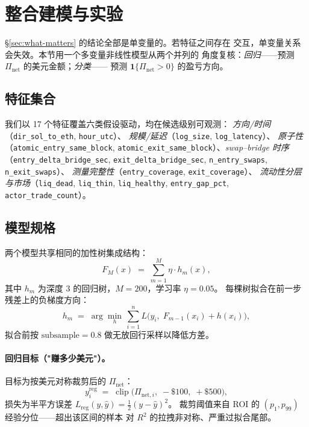 \documentclass[sigconf,nonacm,10pt]{acmart}
\newcommand{\Pnet}{\Pi_{\text{net}}}
\begin{document}
\section{整合建模与实验}
\label{sec:model}

\S\ref{sec:what-matters} 的结论全部是单变量的。若特征之间存在
交互，单变量关系会失效。本节用一个多变量非线性模型从两个并列的
角度复核：\emph{回归}——预测 $\Pnet$ 的美元金额；\emph{分类}——
预测 $\mathbf{1}\{\Pnet>0\}$ 的盈亏方向。

\subsection{特征集合}
\label{sec:features}

我们以 17 个特征覆盖六类假设驱动，均在候选级别可观测：
\emph{方向/时间}（\texttt{dir\_sol\_to\_eth}, \texttt{hour\_utc}）、
\emph{规模/延迟}（\texttt{log\_size}, \texttt{log\_latency}）、
\emph{原子性}（\texttt{atomic\_entry\_same\_block},
\texttt{atomic\_exit\_same\_block}）、\emph{swap--bridge 时序}
（\texttt{entry\_delta\_bridge\_sec},
\texttt{exit\_delta\_bridge\_sec},
\texttt{n\_entry\_swaps}, \texttt{n\_exit\_swaps}）、
\emph{测量完整性}（\texttt{entry\_coverage}, \texttt{exit\_coverage}）、
\emph{流动性分层与市场}（\texttt{liq\_dead}, \texttt{liq\_thin},
\texttt{liq\_healthy}, \texttt{entry\_gap\_pct},
\texttt{actor\_trade\_count}）。

\subsection{模型规格}

两个模型共享相同的加性树集成结构：
\begin{equation}
F_M(x) \;=\; \sum_{m=1}^{M} \eta\cdot h_m(x),
\label{eq:gbm}
\end{equation}
其中 $h_m$ 为深度 $3$ 的回归树，$M=200$，学习率 $\eta=0.05$。
每棵树拟合在前一步残差上的负梯度方向：
\begin{equation}
h_m \;=\; \arg\min_{h}\,\sum_{i=1}^{n}
L\!\bigl(y_i,\; F_{m-1}(x_i)+h(x_i)\bigr),
\label{eq:gbm-update}
\end{equation}
拟合前按 $\text{subsample}=0.8$ 做无放回行采样以降低方差。

\paragraph{回归目标（"赚多少美元"）。}
目标为按美元对称裁剪后的 $\Pnet$：
\begin{equation}
y^{\text{reg}}_i \;=\; \operatorname{clip}\!\bigl(\Pi_{\text{net},i},\;
-\$100,\; +\$500\bigr),
\label{eq:reg-target}
\end{equation}
损失为半平方误差
$L_{\text{reg}}(y,\hat y)=\tfrac12(y-\hat y)^2$。
裁剪阈值来自 ROI 的 $(p_1, p_{99})$ 经验分位——超出该区间的样本
对 $R^2$ 的拉拽非对称、严重过拟合尾部。
\end{document}
